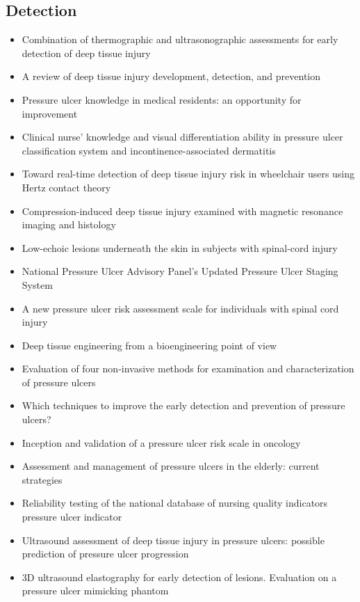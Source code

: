 		\subsection{Detection}
			\begin{itemize}
				\item Combination of thermographic and ultrasonographic assessments for early detection of deep tissue injury \cite{higashino12}
				\item A review of deep tissue injury development, detection, and prevention \cite{gefen13}
				\item Pressure ulcer knowledge in medical residents: an opportunity for improvement \cite{levine12}
				\item Clinical nurse' knowledge and visual differentiation ability in pressure ulcer classification system and incontinence-associated dermatitis \cite{lee13}
				\item Toward real-time detection of deep tissue injury risk in wheelchair users using Hertz contact theory \cite{agam08}
				\item Compression-induced deep tissue injury examined with magnetic resonance imaging and histology \cite{stekelenburg06}
				\item Low-echoic lesions underneath the skin in subjects with spinal-cord injury \cite{kanno09}
				\item National Pressure Ulcer Advisory Panel's Updated Pressure Ulcer Staging System \cite{black07}
				\item A new pressure ulcer risk assessment scale for individuals with spinal cord injury \cite{salzberg96}
				\item Deep tissue engineering from a bioengineering point of view \cite{gefen09}
				\item Evaluation of four non-invasive methods for examination and characterization of pressure ulcers \cite{andersen08}
				\item Which techniques to improve the early detection and prevention of pressure ulcers? \cite{gehin06}
				\item Inception and validation of a pressure ulcer risk scale in oncology \cite{fromantin11}
				\item Assessment and management of pressure ulcers in the elderly: current strategies \cite{jaul10}
				\item Reliability testing of the national database of nursing quality indicators pressure ulcer indicator \cite{hart10}
				\item Ultrasound assessment of deep tissue injury in pressure ulcers: possible prediction of pressure ulcer progression \cite{aoi08}
				\item 3D ultrasound elastography for early detection of lesions. Evaluation on a pressure ulcer mimicking phantom \cite{deprez07}
			\end{itemize}

